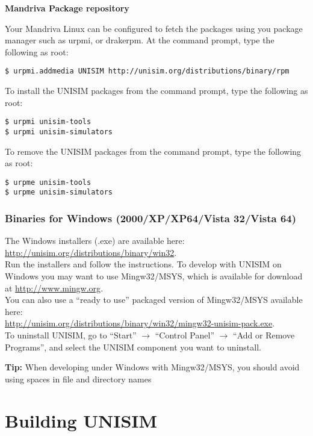 \noindent \textbf{Mandriva Package repository}

Your Mandriva Linux can be configured to fetch the packages using you package manager such as urpmi, or drakerpm.
At the command prompt, type the following as root:

\begin{verbatim}
$ urpmi.addmedia UNISIM http://unisim.org/distributions/binary/rpm
\end{verbatim}

To install the UNISIM packages from the command prompt, type the following as root:

\begin{verbatim}
$ urpmi unisim-tools
$ urpmi unisim-simulators
\end{verbatim}

To remove the UNISIM packages from the command prompt, type the following as root:

\begin{verbatim}
$ urpme unisim-tools
$ urpme unisim-simulators
\end{verbatim}

\subsubsection{Binaries for Windows (2000/XP/XP64/Vista 32/Vista 64)}

The Windows installers (.exe) are available here:\\
\url{http://unisim.org/distributions/binary/win32}.\\
Run the installers and follow the instructions.
To develop with UNISIM on Windows you may want to use Mingw32/MSYS, which is available for download at \url{http://www.mingw.org}.\\
You can also use a “ready to use” packaged version of Mingw32/MSYS available here:\\
\url{http://unisim.org/distributions/binary/win32/mingw32-unisim-pack.exe}.\\
To uninstall UNISIM, go to “Start” $\rightarrow$ “Control Panel” $\rightarrow$ “Add or Remove Programs”, and select the UNISIM component you want to uninstall.

\noindent \textbf{Tip:} When developing under Windows with Mingw32/MSYS, you should avoid using spaces in file and directory names

\section{Building UNISIM}

